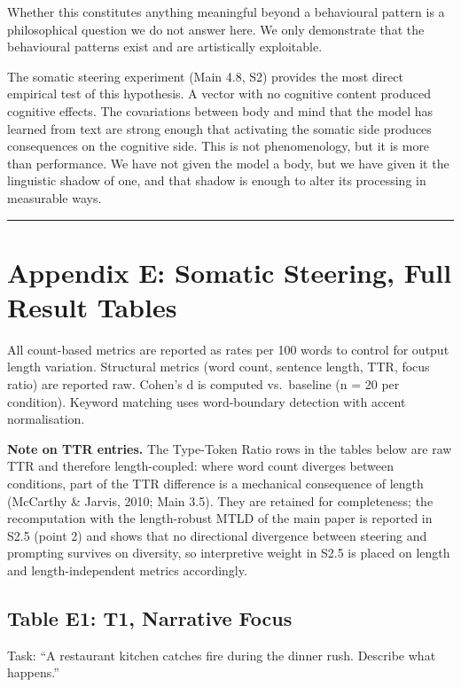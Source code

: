 \documentclass[11pt,a4paper]{article}
\begin{document}
Whether this constitutes anything meaningful beyond a behavioural pattern is a philosophical question we do not answer here. We only demonstrate that the behavioural patterns exist and are artistically exploitable.

The somatic steering experiment (Main 4.8, S2) provides the most direct empirical test of this hypothesis. A vector with no cognitive content produced cognitive effects. The covariations between body and mind that the model has learned from text are strong enough that activating the somatic side produces consequences on the cognitive side. This is not phenomenology, but it is more than performance. We have not given the model a body, but we have given it the linguistic shadow of one, and that shadow is enough to alter its processing in measurable ways.

\begin{center}\rule{0.5\linewidth}{0.5pt}\end{center}

\section*{Appendix E: Somatic Steering, Full Result Tables}

All count-based metrics are reported as rates per 100 words to control for output length variation. Structural metrics (word count, sentence length, TTR, focus ratio) are reported raw. Cohen's d is computed vs.~baseline (n = 20 per condition). Keyword matching uses word-boundary detection with accent normalisation.

\textbf{Note on TTR entries.} The Type-Token Ratio rows in the tables below are raw TTR and therefore length-coupled: where word count diverges between conditions, part of the TTR difference is a mechanical consequence of length (McCarthy \& Jarvis, 2010; Main 3.5). They are retained for completeness; the recomputation with the length-robust MTLD of the main paper is reported in S2.5 (point 2) and shows that no directional divergence between steering and prompting survives on diversity, so interpretive weight in S2.5 is placed on length and length-independent metrics accordingly.

\subsection*{Table E1: T1, Narrative Focus}

Task: ``A restaurant kitchen catches fire during the dinner rush. Describe what happens.''
\end{document}
